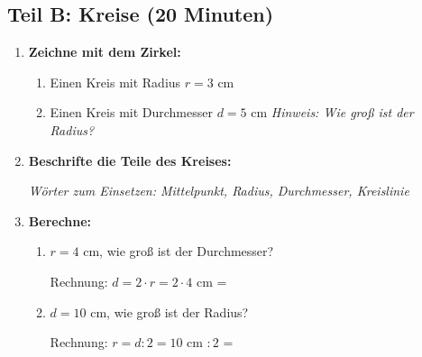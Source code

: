 \subsection*{Teil B: Kreise (20 Minuten)}

\begin{enumerate}[resume, label=\arabic*.]
    \item \textbf{Zeichne mit dem Zirkel:}
    \begin{enumerate}[label=\alph*)]
        \item Einen Kreis mit Radius $r = 3$ cm

        \vspace{5cm}

        \item Einen Kreis mit Durchmesser $d = 5$ cm
        \textit{Hinweis: Wie groß ist der Radius?}

        \vspace{5cm}
    \end{enumerate}

    \vspace{0.5cm}

    \item \textbf{Beschrifte die Teile des Kreises:}

    \begin{center}
    \end{center}

    \textit{Wörter zum Einsetzen: Mittelpunkt, Radius, Durchmesser, Kreislinie}

    \vspace{0.5cm}

    \item \textbf{Berechne:}
    \begin{enumerate}[label=\alph*)]
        \item $r = 4$ cm, wie groß ist der Durchmesser? 

        Rechnung: $d = 2 \cdot r = 2 \cdot 4$ cm = \underline{\hspace{3cm}}

        \item $d = 10$ cm, wie groß ist der Radius? 

        Rechnung: $r = d : 2 = 10$ cm $: 2$ = \underline{\hspace{3cm}}
    \end{enumerate}
\end{enumerate}